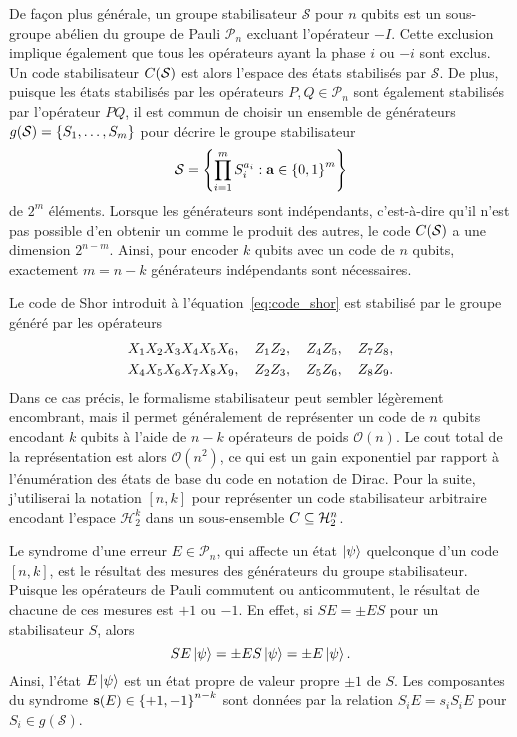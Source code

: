 De façon plus générale,
un groupe stabilisateur $\mathcal S$ pour $n$ qubits est un sous-groupe abélien 
du groupe de Pauli $\mathcal P_n$ excluant l'opérateur $-I$.
Cette exclusion implique également que tous les opérateurs ayant la phase $i$ ou $-i$ sont exclus.
Un code stabilisateur $C(\mathcal S)$ est alors l'espace des états stabilisés par $\mathcal S$.
De plus,
puisque les états stabilisés par les opérateurs $P, Q \in \mathcal P_n$ sont également
stabilisés par l'opérateur $PQ$,
il est commun de choisir un ensemble de générateurs $g(\mathcal S) = \qty{S_1, \ldots, S_m}$
pour décrire le groupe stabilisateur
\begin{align}
  \mathcal S = 
  \qty{
    \prod_{i=1}^m S_i^{a_i} : \vb a \in \qty{0, 1}^m
  }
\end{align}
de $2^m$ éléments.
Lorsque les générateurs sont indépendants,
c'est-à-dire qu'il n'est pas possible d'en obtenir un comme le produit des autres,
le code $C(\mathcal S)$ a une dimension $2^{n - m}$.
Ainsi, 
pour encoder $k$ qubits avec un code de $n$ qubits,
exactement $m = n - k$ générateurs indépendants sont nécessaires.

Le code de Shor introduit à l'équation~\eqref{eq:code_shor} est stabilisé
par le groupe généré par les opérateurs 
\begin{gather}
    X_1 X_2 X_3 X_4 X_5 X_6, \quad
    Z_1 Z_2, \quad Z_4 Z_5, \quad Z_7 Z_8, \notag \\
    X_4 X_5 X_6 X_7 X_8 X_9, \quad
    Z_2 Z_3, \quad Z_5 Z_6, \quad Z_8 Z_9.
\end{gather}
Dans ce cas précis,
le formalisme stabilisateur peut sembler légèrement encombrant,
mais il permet généralement de représenter un code de $n$ qubits encodant $k$ qubits
à l'aide de $n - k$ opérateurs de poids $\mathcal O(n)$.
Le cout total de la représentation est alors $\mathcal O(n^2)$, ce qui est un gain exponentiel
par rapport à l'énumération des états de base du code en notation de Dirac.
Pour la suite,
j'utiliserai la notation $[n, k]$ pour représenter un code stabilisateur arbitraire 
encodant l'espace $\mathcal H_2^k$ dans un sous-ensemble $C \subseteq \mathcal H_2^n$.

Le syndrome d'une erreur $E \in \mathcal P_n$,
qui affecte un état $\ket\psi$ quelconque d'un code $[n, k]$,
est le résultat des mesures des générateurs du groupe stabilisateur.
Puisque les opérateurs de Pauli commutent ou anticommutent,
le résultat de chacune de ces mesures est $+1$ ou $-1$.
En effet, si $SE = \pm ES$ pour un stabilisateur $S$,
alors
\begin{equation}
  SE\ket\psi = \pm E S \ket\psi = \pm E\ket\psi.
\end{equation}
Ainsi,
l'état $E\ket\psi$ est un état propre de valeur propre $\pm 1$ de $S$.
Les composantes du syndrome $\vb{s}(E) \in \qty{+1, -1}^{n - k}$
sont données par la relation $S_iE = s_i S_i E$ pour $S_i \in g(\mathcal S)$.

